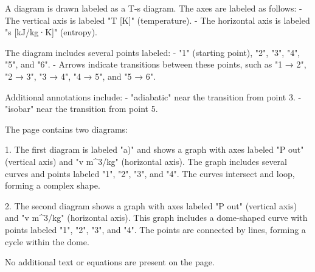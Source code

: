 A diagram is drawn labeled as a T-s diagram. The axes are labeled as follows:  
- The vertical axis is labeled "T [K]" (temperature).  
- The horizontal axis is labeled "s [kJ/kg·K]" (entropy).  

The diagram includes several points labeled:  
- "1" (starting point), "2", "3", "4", "5", and "6".  
- Arrows indicate transitions between these points, such as "1 → 2", "2 → 3", "3 → 4", "4 → 5", and "5 → 6".  

Additional annotations include:  
- "adiabatic" near the transition from point 3.  
- "isobar" near the transition from point 5.

The page contains two diagrams:

1. The first diagram is labeled "a)" and shows a graph with axes labeled "P out" (vertical axis) and "v m^3/kg" (horizontal axis). The graph includes several curves and points labeled "1", "2", "3", and "4". The curves intersect and loop, forming a complex shape.

2. The second diagram shows a graph with axes labeled "P out" (vertical axis) and "v m^3/kg" (horizontal axis). This graph includes a dome-shaped curve with points labeled "1", "2", "3", and "4". The points are connected by lines, forming a cycle within the dome. 

No additional text or equations are present on the page.